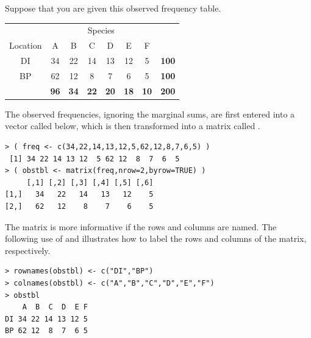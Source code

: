 \documentclass[10pt,openany]{book}\usepackage[]{graphicx}\usepackage[]{color}
\makeatletter
\newenvironment{kframe}{%
 \def\at@end@of@kframe{}%
 \ifinner\ifhmode%
  \def\at@end@of@kframe{\end{minipage}}%
  \begin{minipage}{\columnwidth}%
 \fi\fi%
 \def\FrameCommand##1{\hskip\@totalleftmargin \hskip-\fboxsep
 \colorbox{shadecolor}{##1}\hskip-\fboxsep
     \hskip-\linewidth \hskip-\@totalleftmargin \hskip\columnwidth}%
 \MakeFramed {\advance\hsize-\width
   \@totalleftmargin\z@ \linewidth\hsize
   \@setminipage}}%
 {\par\unskip\endMakeFramed%
 \at@end@of@kframe}
\newenvironment{knitrout}{}{} %
\makeatother
\begin{document}
Suppose that you are given this observed frequency table.

\begin{center}
  \begin{tabular}{c|c|c|c|c|c|c|c|}
    \multicolumn{1}{c}{} & \multicolumn{6}{c}{Species} & \multicolumn{1}{c}{} \\
    \cline{2-7}
    Location & A & B & C & D & E & F & \multicolumn{1}{c}{} \\
    \hline
    \multicolumn{1}{|c|}{DI} & 34 & 22 & 14 & 13 & 12 & 5 & \textbf{100} \\
    \hline
    \multicolumn{1}{|c|}{BP} & 62 & 12 & 8 & 7 & 6 & 5 & \textbf{100} \\
    \hline
    & \textbf{96} & \textbf{34} & \textbf{22} & \textbf{20} & \textbf{18} & \textbf{10} & \textbf{200} \\
    \cline{2-8}
  \end{tabular}
\end{center}

The observed frequencies, ignoring the marginal sums, are first entered into a vector called  below, which is then transformed into a matrix called .
\begin{knitrout}
\color{fgcolor}\begin{kframe}
\begin{verbatim}
> ( freq <- c(34,22,14,13,12,5,62,12,8,7,6,5) )
 [1] 34 22 14 13 12  5 62 12  8  7  6  5
> ( obstbl <- matrix(freq,nrow=2,byrow=TRUE) )
     [,1] [,2] [,3] [,4] [,5] [,6]
[1,]   34   22   14   13   12    5
[2,]   62   12    8    7    6    5
\end{verbatim}
\end{kframe}
\end{knitrout}

The matrix is more informative if the rows and columns are named. The following use of  and  illustrates how to label the rows and columns of the  matrix, respectively.
\begin{knitrout}
\color{fgcolor}\begin{kframe}
\begin{verbatim}
> rownames(obstbl) <- c("DI","BP")
> colnames(obstbl) <- c("A","B","C","D","E","F")
> obstbl
    A  B  C  D  E F
DI 34 22 14 13 12 5
BP 62 12  8  7  6 5
\end{verbatim}
\end{kframe}
\end{knitrout}
\end{document}
